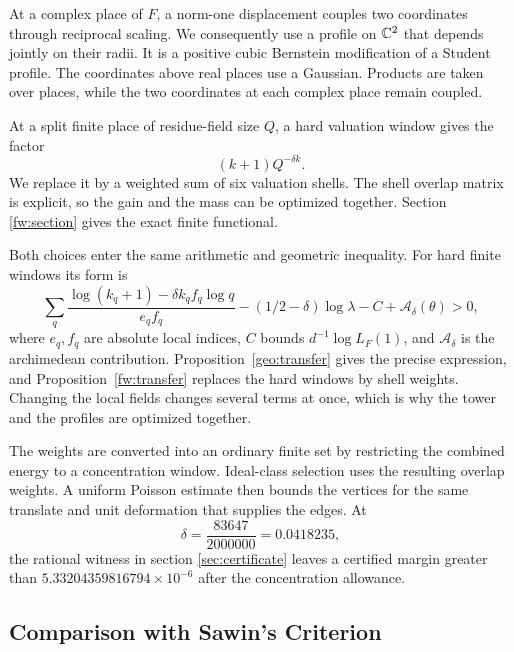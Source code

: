 At a complex place of $F$, a norm-one displacement couples two
coordinates through reciprocal scaling. We consequently use a
profile on $\mathbb C^2$ that depends jointly on their radii. It is a positive
cubic Bernstein modification of a Student profile. The coordinates
above real places use a Gaussian. Products are taken over places,
while the two coordinates at each complex place remain coupled.

At a split finite place of residue-field size $Q$, a hard valuation
window gives the factor
\[
 (k+1)Q^{-\delta k}.
\]
We replace it by a weighted sum of six valuation shells. The shell
overlap matrix is explicit, so the gain and the mass can be optimized
together. Section \ref{fw:section} gives the exact finite functional.

Both choices enter the same arithmetic and geometric inequality.
For hard finite windows its form is
\begin{equation}\label{intro:margin}
 \sum_q\frac{\log(k_q+1)-\delta k_qf_q\log q}{e_qf_q}
 -(1/2-\delta)\log\lambda-C+\mathcal A_\delta(\theta)>0,
\end{equation}
where $e_q,f_q$ are absolute local indices, $C$ bounds
$d^{-1}\log L_F(1)$, and $\mathcal A_\delta$ is the archimedean
contribution. Proposition~\ref{geo:transfer} gives the precise
expression, and Proposition~\ref{fw:transfer} replaces the hard
windows by shell weights. Changing the local fields changes several
terms at once, which is why the tower and the profiles are optimized
together.

The weights are converted into an ordinary finite set by restricting
the combined energy to a concentration window. Ideal-class selection
uses the resulting overlap weights. A uniform Poisson estimate then
bounds the vertices for the same translate and unit deformation that
supplies the edges. At
\[
 \delta=\frac{83647}{2000000}=0.0418235,
\]
the rational witness in section \ref{sec:certificate} leaves a
certified margin greater than $5.33204359816794\times10^{-6}$
after the concentration allowance.

\subsection{Comparison with Sawin's Criterion}
\label{intro:sawin}

